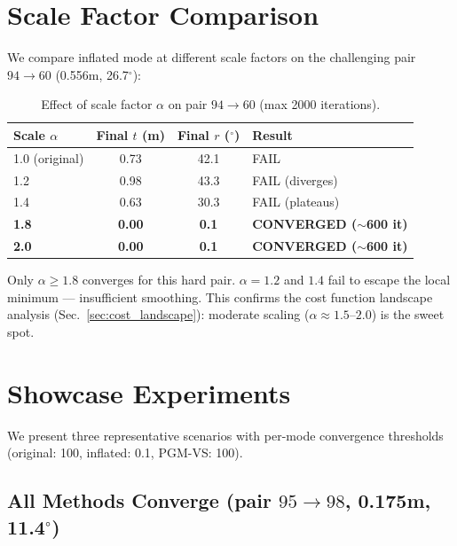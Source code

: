 \documentclass[11pt]{article}
\begin{document}
\section{Scale Factor Comparison}
\label{sec:scale_sweep_qual}

We compare inflated mode at different scale factors on the challenging pair $94 \to 60$ (0.556m, 26.7$^\circ$):

\begin{table}[h!]
\centering
\caption{Effect of scale factor $\alpha$ on pair $94 \to 60$ (max 2000 iterations).}
\label{tab:scale_sweep}
\begin{tabular}{lccl}
\toprule
\textbf{Scale $\alpha$} & \textbf{Final $t$ (m)} & \textbf{Final $r$ ($^\circ$)} & \textbf{Result} \\
\midrule
1.0 (original) & 0.73 & 42.1 & FAIL \\
1.2 & 0.98 & 43.3 & FAIL (diverges) \\
1.4 & 0.63 & 30.3 & FAIL (plateaus) \\
\textbf{1.8} & \textbf{0.00} & \textbf{0.1} & \textbf{CONVERGED ($\sim$600 it)} \\
\textbf{2.0} & \textbf{0.00} & \textbf{0.1} & \textbf{CONVERGED ($\sim$600 it)} \\
\bottomrule
\end{tabular}
\end{table}

Only $\alpha \geq 1.8$ converges for this hard pair. $\alpha = 1.2$ and $1.4$ fail to escape the local minimum --- insufficient smoothing. This confirms the cost function landscape analysis (Sec.~\ref{sec:cost_landscape}): moderate scaling ($\alpha \approx 1.5$--$2.0$) is the sweet spot.


\section{Showcase Experiments}
\label{sec:showcases}

We present three representative scenarios with per-mode convergence thresholds (original: 100, inflated: 0.1, PGM-VS: 100).

\subsection{All Methods Converge (pair $95 \to 98$, 0.175m, 11.4$^\circ$)}
\end{document}
